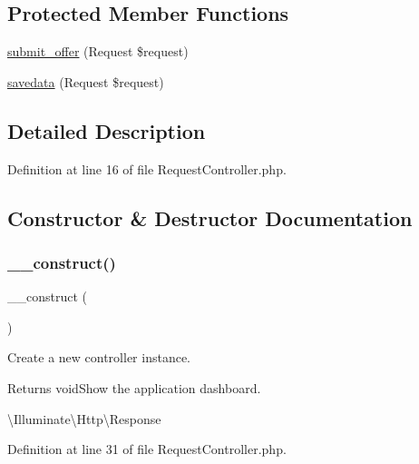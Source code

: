 \subsection*{Protected Member Functions}
\begin{DoxyCompactItemize}
\item 
\mbox{\hyperlink{class_responsive_1_1_http_1_1_controllers_1_1_request_controller_a634b653af2d0d7fb3b69cdb49c8d0bf3}{submit\+\_\+offer}} (Request \$request)
\item 
\mbox{\hyperlink{class_responsive_1_1_http_1_1_controllers_1_1_request_controller_a39992cc1c190dd16b2de573a70a7f5dc}{savedata}} (Request \$request)
\end{DoxyCompactItemize}


\subsection{Detailed Description}


Definition at line 16 of file Request\+Controller.\+php.



\subsection{Constructor \& Destructor Documentation}
\mbox{\label{class_responsive_1_1_http_1_1_controllers_1_1_request_controller_a095c5d389db211932136b53f25f39685}} 
\subsubsection{\texorpdfstring{\_\_construct()}{\_\_construct()}}
{\footnotesize\ttfamily \+\_\+\+\_\+construct (\begin{DoxyParamCaption}{ }\end{DoxyParamCaption})}

Create a new controller instance.

\begin{DoxyReturn}{Returns}
void\+Show the application dashboard.

\textbackslash{}\+Illuminate\textbackslash{}\+Http\textbackslash{}\+Response 
\end{DoxyReturn}


Definition at line 31 of file Request\+Controller.\+php.




